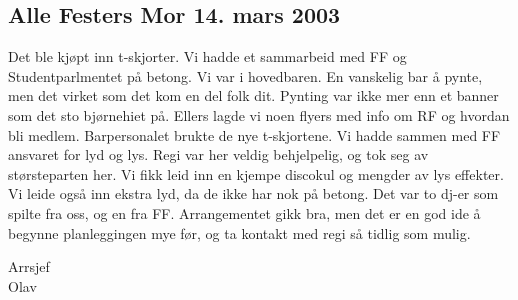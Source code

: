\subsection{Alle Festers Mor 14. mars 2003}

Det ble kjøpt inn t-skjorter. 
Vi hadde et sammarbeid med FF og Studentparlmentet på betong. Vi var i
hovedbaren. En vanskelig bar å pynte, men det virket som det kom en
del folk dit. Pynting var ikke mer enn et banner som det sto
bjørnehiet på. Ellers lagde vi noen flyers med info om RF og hvordan
bli medlem. Barpersonalet brukte de nye t-skjortene.
Vi hadde sammen med FF ansvaret for lyd og lys. Regi var her veldig
behjelpelig, og tok seg av størsteparten her. Vi fikk leid inn en
kjempe discokul og mengder av lys effekter. Vi leide også inn ekstra
lyd, da de ikke har nok på betong. Det var to dj-er som spilte fra
oss, og en fra FF.
Arrangementet gikk bra, men det er en god ide å begynne planleggingen
mye før, og ta kontakt med regi så tidlig som mulig.

Arrsjef \\
Olav
